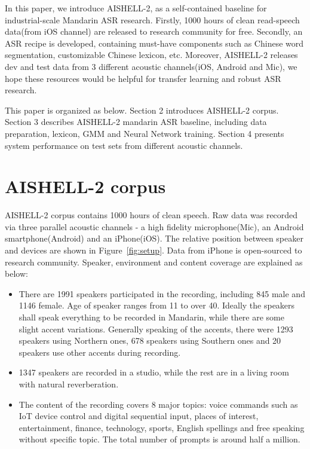 \documentclass[a4paper]{article}
\begin{document}
In this paper, we introduce AISHELL-2, as a self-contained baseline for industrial-scale Mandarin ASR research. 
Firstly, 1000 hours of clean read-speech data(from iOS channel) are released to research community for free.
Secondly, an ASR recipe is developed, containing must-have components such as Chinese word segmentation, 
customizable Chinese lexicon, etc. 
Moreover, AISHELL-2 releases dev and test data from 3 different acoustic channels(iOS, Android and Mic),
we hope these resources would be helpful for transfer learning and robust ASR research.

This paper is organized as below. Section 2 introduces AISHELL-2 corpus. 
Section 3 describes AISHELL-2 mandarin ASR baseline, including data preparation, lexicon, GMM and Neural Network training.
Section 4 presents system performance on test sets from different acoustic channels.

\section{AISHELL-2 corpus}

AISHELL-2 corpus contains 1000 hours of clean speech. Raw data was recorded via three parallel acoustic channels - a high fidelity microphone(Mic), an Android smartphone(Android) and an iPhone(iOS). The relative position between speaker and devices are shown in Figure~\ref{fig:setup}. Data from iPhone is open-sourced to research community. Speaker, environment and content coverage are explained as below:
\begin{itemize}
\item There are 1991 speakers participated in the recording, including 845 male and 1146 female. Age of speaker ranges from 11 to over 40. Ideally the speakers shall speak everything to be recorded in Mandarin, while there are some slight accent variations. Generally speaking of the accents, there were 1293 speakers using Northern ones, 678 speakers using Southern ones and 20 speakers use other accents during recording. 
\item 1347 speakers are recorded in a studio, while the rest are in a living room with natural reverberation.
\item The content of the recording covers 8 major topics: voice commands such as IoT device control and digital sequential input, places of interest, entertainment, finance, technology, sports, English spellings and free speaking without specific topic. The total number of prompts is around half a million.
\end{itemize}
\end{document}
